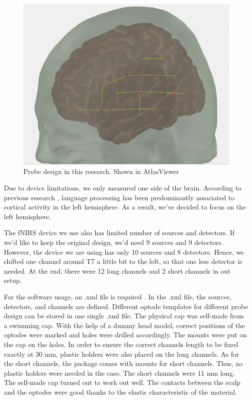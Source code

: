 \begin{figure}[H]
  \centering
    \includegraphics[scale=.35]{bilder/atlas_probe.png}
  \caption{Probe design in this research. Shown in AtlasViewer}
  \label{fig:somesignal}
\end{figure}


Due to device limitations, we only measured one side of the brain. According to previous research \cite {Frost1999-vs} , language processing has been predominantly associated to cortical activity in the left hemisphere. As a result, we've decided to focus on the left hemisphere.

The fNIRS device we use also has limited number of sources and detectors. If we'd like to keep the original design, we'd need 9 sources and 9 detectors. However, the device we are using has only 10 sources and 8 detectors. Hence, we shifted one channel around T7 a little bit to the left, so that one less detector is needed. At the end, there were 12 long channels and 2 short channels in out setup.

For the software usage, an .xml file is required . In the .xml file, the sources, detectors, and channels are defined. Different optode templates for different probe design can be stored in one single .xml file. The physical cap was self-made from a swimming cap. With the help of a dummy head model, correct positions of the optodes were marked and holes were drilled accordingly. The mounts were put on the cap on the holes. In order to ensure the correct channels length to be fixed exactly at 30 mm, plastic holders were also placed on the long channels. As for the short channels, the  package comes with mounts for short channels. Thus, no plastic holders were needed in the case. The short channels were 11 mm long. The self-made cap turned out to work out well. The contacts between the scalp and the optodes were good thanks to the elastic characteristic of the material.

